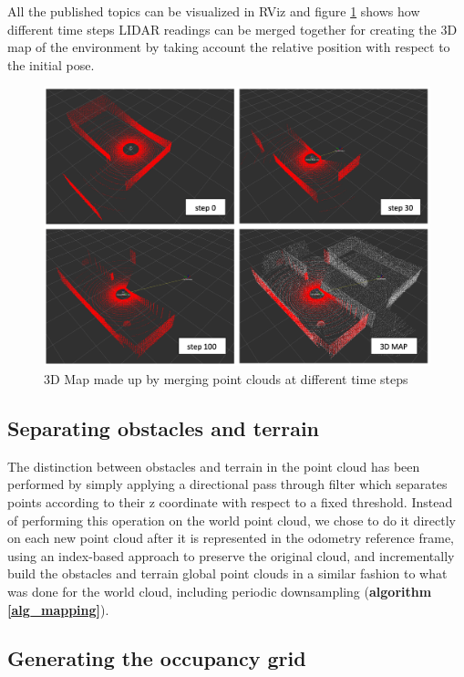 \documentclass[9pt,conference]{IEEEtran}
\begin{document}
All the published topics can be visualized in RViz and figure \ref{fig:current-clouds} shows how different time steps LIDAR readings can be merged together for creating the 3D map of the environment by taking account the relative position with respect to the initial pose.

\begin{figure}[h!]
    \centering
    \includegraphics[width=1\linewidth]{images/03A merge.png}
    \caption{3D Map made up by merging point clouds at different time steps}
    \label{fig:current-clouds}
\end{figure}


\subsection{Separating obstacles and terrain}

The distinction between obstacles and terrain in the point cloud has been performed by simply applying a directional pass through filter which separates points according to their z coordinate with respect to a fixed threshold. Instead of performing this operation on the world point cloud, we chose to do it directly on each new point cloud after it is represented in the odometry reference frame, using an index-based approach to preserve the original cloud, and incrementally build the obstacles and terrain global point clouds in a similar fashion to what was done for the world cloud, including periodic downsampling (\textbf{algorithm \ref{alg_mapping}}). 


\subsection{Generating the occupancy grid}
\end{document}
